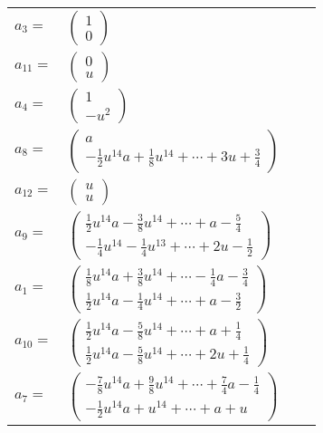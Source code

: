 \documentclass[1p]{elsarticle_modified}
\theoremstyle{definition}
\begin{document}
\begin{tabular}{m{7pt} m{180pt} m{7pt} m{180pt} }
\flushright $a_{3}=$&$\begin{pmatrix}1\\0\end{pmatrix}$ \\
\flushright $a_{11}=$&$\begin{pmatrix}0\\u\end{pmatrix}$ \\
\flushright $a_{4}=$&$\begin{pmatrix}1\\- u^2\end{pmatrix}$ \\
\flushright $a_{8}=$&$\begin{pmatrix}a\\-\frac{1}{2} u^{14} a+\frac{1}{8} u^{14}+\cdots+3 u+\frac{3}{4}\end{pmatrix}$ \\
\flushright $a_{12}=$&$\begin{pmatrix}u\\u\end{pmatrix}$ \\
\flushright $a_{9}=$&$\begin{pmatrix}\frac{1}{2} u^{14} a-\frac{3}{8} u^{14}+\cdots+a-\frac{5}{4}\\-\frac{1}{4} u^{14}-\frac{1}{4} u^{13}+\cdots+2 u-\frac{1}{2}\end{pmatrix}$ \\
\flushright $a_{1}=$&$\begin{pmatrix}\frac{1}{8} u^{14} a+\frac{3}{8} u^{14}+\cdots-\frac{1}{4} a-\frac{3}{4}\\\frac{1}{2} u^{14} a-\frac{1}{4} u^{14}+\cdots+a-\frac{3}{2}\end{pmatrix}$ \\
\flushright $a_{10}=$&$\begin{pmatrix}\frac{1}{2} u^{14} a-\frac{5}{8} u^{14}+\cdots+a+\frac{1}{4}\\\frac{1}{2} u^{14} a-\frac{5}{8} u^{14}+\cdots+2 u+\frac{1}{4}\end{pmatrix}$ \\
\flushright $a_{7}=$&$\begin{pmatrix}-\frac{7}{8} u^{14} a+\frac{9}{8} u^{14}+\cdots+\frac{7}{4} a-\frac{1}{4}\\-\frac{1}{2} u^{14} a+u^{14}+\cdots+a+u\end{pmatrix}$ \\

\end{tabular}
\end{document}
